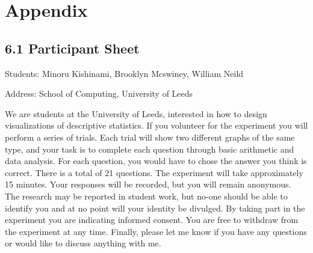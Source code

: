 \section{Appendix}
\subsection*{6.1 Participant Sheet}
\begin{flushleft}
Students: Minoru Kishinami, Brooklyn Mcswiney, William Neild

Address: School of Computing, University of Leeds
\medskip
 
\quad We are students at the University of Leeds, interested in how to design visualizations of descriptive statistics. If you volunteer for the experiment you will perform a series of trials. Each trial will show two different graphs of the same type, and your task is to complete each question through basic arithmetic and data analysis. For each question, you would have to chose the answer you think is correct. There is a total of 21 questions.
The experiment will take approximately 15 minutes. Your responses will be recorded, but you will remain anonymous. The research may be reported in student work, but no-one should be able to identify you and at no point will your identity be divulged.
By taking part in the experiment you are indicating informed consent. You are free to withdraw from the experiment at any time. 
Finally, please let me know if you have any questions or would like to discuss anything with me.
\end{flushleft}
